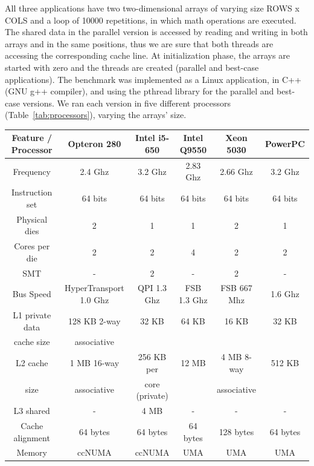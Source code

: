 \documentclass[conference]{IEEEtran}
\begin{document}
All three applications have two two-dimensional arrays of varying size ROWS x COLS and a loop of 10000 repetitions, in which math operations are executed. The shared data in the parallel version is accessed by reading and writing in both arrays and in the same positions, thus we are sure that both threads are accessing the corresponding cache line. At initialization phase, the arrays are started with zero and the threads are created (parallel and best-case applications). The benchmark was implemented as a Linux application, in C++ (GNU g++ compiler), and using the pthread library for the parallel and best-case versions. We ran each version in five different processors (Table~\ref{tab:processors}), varying the arrays' size.


\begin{savenotes}
\begin{table}
\begin{center}
\footnotesize{
\begin{tabular}{|c|c|c|c|c|c|}
\hline
\textbf{Feature / Processor} & \textbf{Opteron 280} & \textbf{Intel i5-650} & \textbf{Intel Q9550} & \textbf{Xeon 5030} & \textbf{PowerPC} \\
\hline
Frequency & 2.4 Ghz & 3.2 Ghz &  2.83 Ghz & 2.66 Ghz & 3.2 Ghz\\
\hline
Instruction set & 64 bits & 64 bits & 64 bits & 64 bits & 64 bits \\
\hline
Physical dies & 2 & 1 & 1 & 2 & 1\\
\hline
Cores per die & 2 & 2 & 4 & 2 & 2\\
\hline
SMT & - & 2 & - & 2 & -\\
\hline
Bus Speed & HyperTransport 1.0 Ghz & QPI 1.3 Ghz & FSB 1.3 Ghz & FSB 667 Mhz & 1.6 Ghz\\
\hline
L1 private data & 128 KB 2-way & 32 KB &  64 KB & 16 KB & 32 KB \\
cache size 		& associative  & 	   & 		&	    &		\\  				
\hline
L2 cache  & 1 MB 16-way  & 256 KB per 	   &  12 MB & 4 MB 8-way  & 512 KB\\ 
size 	  & associative  & core (private)  &  		& associative & 	  \\
\hline
L3 shared & - & 4 MB & - & - & - \\
\hline
Cache alignment & 64 bytes & 64 bytes & 64 bytes & 128 bytes & 64 bytes \\
\hline
Memory			& ccNUMA   & ccNUMA	  & UMA & UMA & UMA\\

\end{tabular}}
\end{center}
\end{table}
\end{savenotes}
\end{document}
